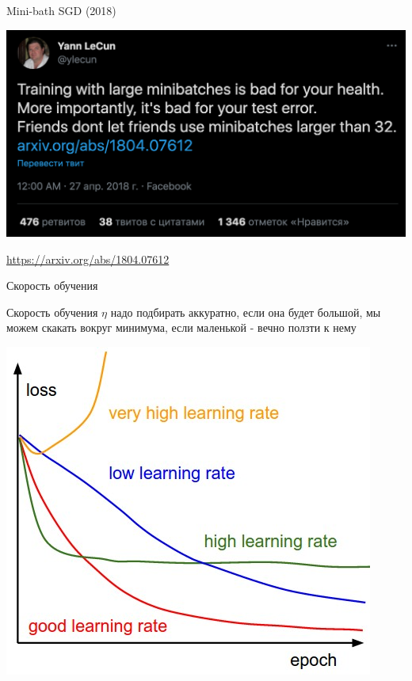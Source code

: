 \documentclass[notes,12pt, aspectratio=169]{beamer}
\newenvironment{wideitemize}{\itemize\addtolength{\itemsep}{10pt}}{\enditemize}
\begin{document}
\begin{frame}{Mini-bath SGD (2018)}
\begin{center}
	\includegraphics[width=0.8\paperwidth]{lec_meme.png}
\end{center}
\vfill %
\footnotesize 
\color{blue} \url{https://arxiv.org/abs/1804.07612}
\end{frame}




\begin{frame}{Скорость обучения}
\begin{wideitemize}
	\item Скорость обучения $\eta$ надо подбирать аккуратно, если она будет большой, мы можем скакать вокруг минимума, если маленькой - вечно ползти к нему
	
	\begin{center}
		\includegraphics[width=0.37\paperwidth]{learningrates.jpg}
	\end{center}
\end{wideitemize}
\end{frame}
\end{document}
